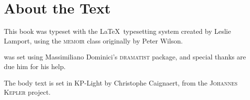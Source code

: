 
\chapter{About the Text}

\begin{adjustwidth}{0.5in}{0.5in}
\begin{center}
\setlength{\parskip}{\baselineskip}

This book was typeset with the \LaTeX\ typesetting system created by Leslie Lamport,
using the \textsc{memoir} class originally by Peter Wilson.

\emph{\theplaytitle} was set using Massimiliano Dominici’s \textsc{dramatist} package,
and special thanks are due him for his help.

The body text is set in KP-Light by Christophe Caignaert,
from the \textsc{Johannes Kepler} project.
\end{center}
\end{adjustwidth}

\endinput
